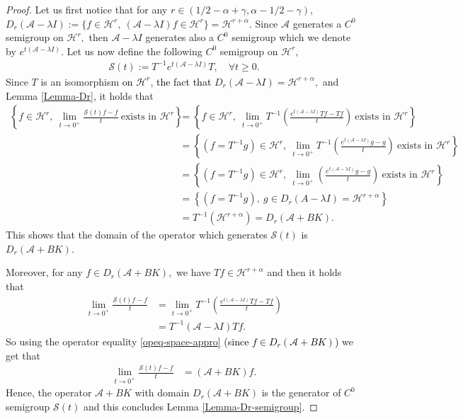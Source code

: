 \documentclass[11pt, dvipsnames]{amsart}
\begin{document}
\begin{proof}
    Let us first notice that for any $r\in (1/2-\alpha+\gamma,\alpha-1/2-\gamma),$ 
    $D_r(\mathcal{A}-\lambda I):=\{f\in \mathcal{H}^r,\ (\mathcal{A}-\lambda I)f\in \mathcal{H}^r\}=\mathcal{H}^{r+\alpha}.$ Since $\mathcal{A}$ generates a $C^0$ semigroup on $\mathcal{H}^r,$ then $\mathcal{A}-\lambda I$ generates also a $C^0$ semigroup which we denote by $e^{t(\mathcal{A}-\lambda I)}.$ Let us now define the following $C^0$ semigroup on $\mathcal{H}^r,$
    \begin{align}
    \label{eq:semi}
        \mathcal{S}(t):=T^{-1}e^{t(\mathcal{A}-\lambda I)}T, \quad \forall t\geq 0.
    \end{align}
    Since $T$ is an isomorphism \textcolor{black}{on $\mathcal{H}^{r}$}, \textcolor{black}{the fact that} $D_r(\mathcal{A}-\lambda I)=\mathcal{H}^{r+\alpha},$ and Lemma \ref{Lemma-Dr}, it holds that
    \begin{align*}
        \left\{f\in \mathcal{H}^r,\ \underset{t\rightarrow 0^+}{\lim}\frac{\mathcal{S}(t)f-f}{t}\ \text{exists in }\mathcal{H}^{r}\right\}
        &=\left\{f\in \mathcal{H}^r,\ \underset{t\rightarrow 0^+}{\lim}T^{-1}\left(\frac{e^{t(\mathcal{A}-\lambda I)}Tf-Tf}{t}\right)\ \text{exists in }\mathcal{H}^{r}\right\}\\
        &=\left\{(f=T^{-1}g)\in \mathcal{H}^r,\ \underset{t\rightarrow 0^+}{\lim}T^{-1}\left(\frac{e^{t(\mathcal{A}-\lambda I)}g-g}{t}\right)\ \text{exists in }\mathcal{H}^{r}\right\}\\
        &=\left\{(f=T^{-1}g)\in \mathcal{H}^r,\ \underset{t\rightarrow 0^+}{\lim}\left(\frac{e^{t(\mathcal{A}-\lambda I)}g-g}{t}\right)\ \text{exists in }\mathcal{H}^{r}\right\}\\
        &=\left\{(f=T^{-1}g),\ g\in D_r(A-\lambda I)=\mathcal{H}^{r+\alpha}\right\}\\
        &=T^{-1}(\mathcal{H}^{r+\alpha})=D_r(\mathcal{A}+BK).
    \end{align*}
    This shows that the domain of the operator which generates $\mathcal{S}(t)$ is $D_r(\mathcal{A}+BK).$ 
    
    Moreover, for any $f\in D_r(\mathcal{A}+BK),$ we have $Tf\in \mathcal{H}^{r+\alpha}$ and then it holds that
    \begin{align*}
     \underset{t\rightarrow 0^+}{\lim}\frac{\mathcal{S}(t)f-f}{t}&=\underset{t\rightarrow 0^+}{\lim}T^{-1}\left(\frac{e^{t(\mathcal{A}-\lambda I)}Tf-Tf}{t}\right) \\
     &=T^{-1}(\mathcal{A}-\lambda I)Tf.
    \end{align*}
    So using the operator equality \eqref{opeq-space-appro} \textcolor{black}{(since $f\in D_{r}(\mathcal{A}+BK)$)} we get that
    \begin{align*}
        \underset{t\rightarrow 0^+}{\lim}\frac{\mathcal{S}(t)f-f}{t}&=(\mathcal{A}+BK)f.
    \end{align*}
  Hence, the operator $\mathcal{A}+BK$  with domain $D_r(\mathcal{A}+BK)$ is the generator of $C^0$ semigroup $\mathcal{S}(t)$ and this concludes Lemma \ref{Lemma-Dr-semigroup}.
\end{proof}
\end{document}

